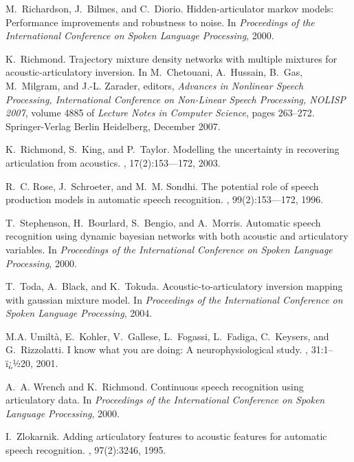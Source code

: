 \documentclass{pnastwo}
\begin{document}
\begin{article}
\begin{thebibliography}{99}
M.~Richardson, J.~Bilmes, and C.~Diorio.
\newblock Hidden-articulator markov models: Performance improvements and
  robustness to noise.
\newblock In {\em Proceedings of the International Conference on Spoken
  Language Processing}, 2000.

K.~Richmond.
\newblock Trajectory mixture density networks with multiple mixtures for
  acoustic-articulatory inversion.
\newblock In M.~Chetouani, A.~Hussain, B.~Gas, M.~Milgram, and J.-L. Zarader,
  editors, {\em Advances in Nonlinear Speech Processing, International
  Conference on Non-Linear Speech Processing, NOLISP 2007}, volume 4885 of {\em
  Lecture Notes in Computer Science}, pages 263--272. Springer-Verlag Berlin
  Heidelberg, December 2007.

K.~Richmond, S.~King, and P.~Taylor.
\newblock Modelling the uncertainty in recovering articulation from acoustics.
, 17(2):153---172, 2003.

R.~C. Rose, J.~Schroeter, and M.~M. Sondhi.
\newblock The potential role of speech production models in automatic speech
  recognition.
, 99(2):153---172,
  1996.

T.~Stephenson, H.~Bourlard, S.~Bengio, and A.~Morris.
\newblock Automatic speech recognition using dynamic bayesian networks with
  both acoustic and articulatory variables.
\newblock In {\em Proceedings of the International Conference on Spoken
  Language Processing}, 2000.

T.~Toda, A.~Black, and K.~Tokuda.
\newblock Acoustic-to-articulatory inversion mapping with gaussian mixture
  model.
\newblock In {\em Proceedings of the International Conference on Spoken
  Language Processing}, 2004.

M.A. Umilt\`a, E.~Kohler, V.~Gallese, L.~Fogassi, L.~Fadiga, C.~Keysers, and
  G.~Rizzolatti.
\newblock I know what you are doing: A neurophysiological study.
, 31:1--ï¿½20, 2001.

A.~A. Wrench and K.~Richmond.
\newblock Continuous speech recognition using articulatory data.
\newblock In {\em Proceedings of the International Conference on Spoken
  Language Processing}, 2000.

I.~Zlokarnik.
\newblock Adding articulatory features to acoustic features for automatic
  speech recognition.
, 97(2):3246, 1995.


\end{thebibliography}

\end{article}
\end{document}
